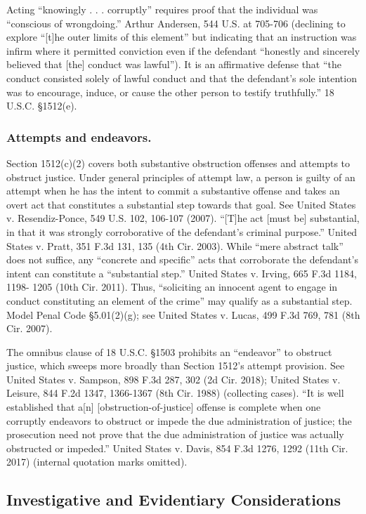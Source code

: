 Acting “knowingly . . . corruptly” requires proof that the individual was “conscious of wrongdoing.”
Arthur Andersen, 544 U.S. at 705-706 (declining to explore “[t]he outer limits of this element” but indicating that an instruction was infirm where it permitted conviction even if the defendant “honestly and sincerely believed that [the] conduct was lawful”).
It is an affirmative defense that “the conduct consisted solely of lawful conduct and that the defendant’s sole intention was to encourage, induce, or cause the other person to testify truthfully.”
18 U.S.C. \S 1512(e).

\subsubsection*{Attempts and endeavors.}
Section 1512(c)(2) covers both substantive obstruction offenses and attempts to obstruct justice. Under general principles of attempt law, a person is guilty of an attempt when he has the intent to commit a substantive offense and takes an overt act that constitutes a substantial step towards that goal.
See United States v. Resendiz-Ponce, 549 U.S. 102, 106-107 (2007).
“[T]he act [must be] substantial, in that it was strongly corroborative of the defendant’s criminal purpose.”
United States v. Pratt, 351 F.3d 131, 135 (4th Cir. 2003).
While “mere abstract talk” does not suffice, any “concrete and specific” acts that corroborate the defendant’s intent can constitute a “substantial step.”
United States v. Irving, 665 F.3d 1184, 1198- 1205 (10th Cir. 2011).
Thus, “soliciting an innocent agent to engage in conduct constituting an element of the crime” may qualify as a substantial step.
Model Penal Code \S 5.01(2)(g);
see United States v. Lucas, 499 F.3d 769, 781 (8th Cir. 2007).

The omnibus clause of 18 U.S.C. \S 1503 prohibits an “endeavor” to obstruct justice, which sweeps more broadly than Section 1512’s attempt provision.
See United States v. Sampson, 898 F.3d 287, 302 (2d Cir. 2018);
United States v. Leisure, 844 F.2d 1347, 1366-1367 (8th Cir. 1988) (collecting cases).
“It is well established that a[n] [obstruction-of-justice] offense is complete when one corruptly endeavors to obstruct or impede the due administration of justice;
the prosecution need not prove that the due administration of justice was actually obstructed or impeded.”
United States v. Davis, 854 F.3d 1276, 1292 (11th Cir. 2017) (internal quotation marks omitted).

\subsection{Investigative and Evidentiary Considerations}

